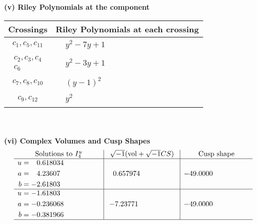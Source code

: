 \documentclass[1p]{elsarticle_modified}
\theoremstyle{definition}
\newcommand{\I}{\sqrt{-1}}
\begin{document}
\newpage\renewcommand{\arraystretch}{1}
\flushleft \textbf{(v) Riley Polynomials at the component}\newline \\
\begin{tabular}{m{50pt}|m{274pt}}
Crossings & \hspace{64pt}Riley Polynomials at each crossing \\
\hline $$\begin{aligned}c_{1},c_{5},c_{11}\end{aligned}$$&$\begin{aligned}
&y^2-7 y+1
\end{aligned}$\\
\hline $$\begin{aligned}c_{2},c_{3},c_{4}\\c_{6}\end{aligned}$$&$\begin{aligned}
&y^2-3 y+1
\end{aligned}$\\
\hline $$\begin{aligned}c_{7},c_{8},c_{10}\end{aligned}$$&$\begin{aligned}
&(y-1)^2
\end{aligned}$\\
\hline $$\begin{aligned}c_{9},c_{12}\end{aligned}$$&$\begin{aligned}
&y^2
\end{aligned}$\\
\hline
\end{tabular}\\~\\
\newpage\flushleft \textbf{(vi) Complex Volumes and Cusp Shapes}
$$\begin{array}{c|c|c}  
\text{Solutions to }I^u_{4}& \I (\text{vol} + \sqrt{-1}CS) & \text{Cusp shape}\\
 \hline 
\begin{aligned}
u &= \phantom{-}0.618034\phantom{ +0.000000I} \\
a &= \phantom{-}4.23607\phantom{ +0.000000I} \\
b &= -2.61803\phantom{ +0.000000I}\end{aligned}
 & \phantom{-}0.657974\phantom{ +0.000000I} & -49.0000\phantom{ +0.000000I} \\ \hline\begin{aligned}
u &= -1.61803\phantom{ +0.000000I} \\
a &= -0.236068\phantom{ +0.000000I} \\
b &= -0.381966\phantom{ +0.000000I}\end{aligned}
 & -7.23771\phantom{ +0.000000I} & -49.0000\phantom{ +0.000000I}\\
 \hline 
 \end{array}$$\newpage
\end{document}
